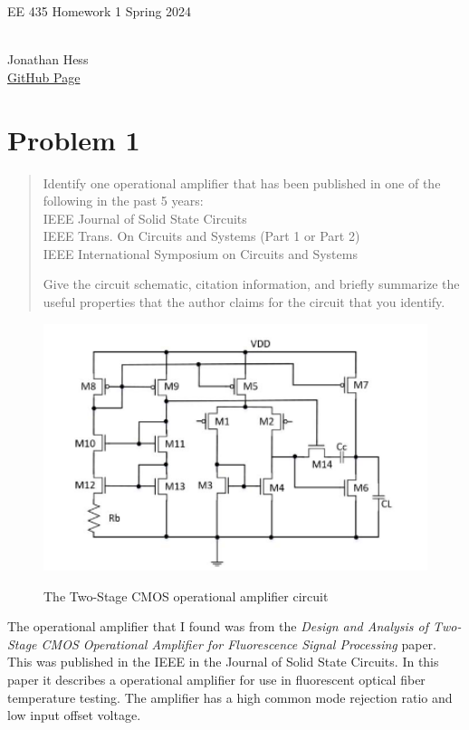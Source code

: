 \documentclass[10pt,a4paper]{article}
\author{}
\date{}
\begin{document}
\begin{flushleft}
\begin{LARGE}EE 435 Homework 1 Spring 2024
\end{LARGE}
\\Jonathan Hess
\\\href{https://github.com/Jetsama/EE435/tree/main/HW1}{GitHub Page}
\end{flushleft}



\section{Problem 1}
\begin{quote}
Identify one operational amplifier that has been published in
one of the following in the past 5 years:\\
IEEE Journal of Solid State Circuits\\
IEEE Trans. On Circuits and Systems (Part 1 or Part 2)\\
IEEE International Symposium on Circuits and Systems

Give the circuit schematic, citation information, and briefly summarize
the useful properties that the author claims for the circuit that you
identify.

\end{quote}

\begin{figure}[H]
\centering
\includegraphics[width=6in]{images/TwoStageCMOSAMP.png} \\
\caption{The Two-Stage CMOS operational amplifier circuit\cite{opamp}}
\end{figure}

The operational amplifier that I found was from the \textit{Design and Analysis of Two-Stage CMOS Operational Amplifier for Fluorescence Signal Processing}\cite{opamp} paper. This was published in the IEEE in the Journal of Solid State Circuits. In this paper it describes a operational amplifier for use in fluorescent optical fiber temperature testing. The amplifier has a high common mode rejection ratio and low input offset voltage. 
\end{document}

